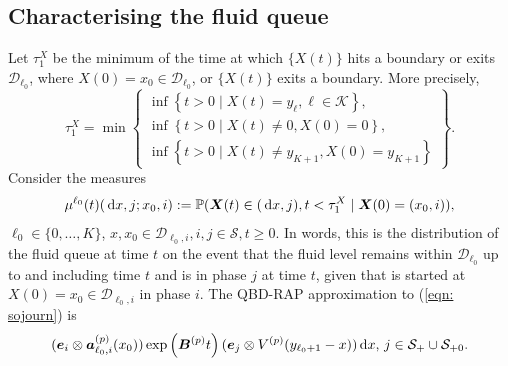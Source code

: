 \subsection{Characterising the fluid queue}
Let \(\tau_1^X\) be the minimum of the time at which \(\{X(t)\}\) hits a boundary or exits \(\mathcal D_{\ell_0}\), where \(X(0)=x_0\in\mathcal D_{\ell_0}\), or \(\{X(t)\}\) exits a boundary. More precisely, 
\[\tau_1^X = \min\left\{\begin{array}{c}\inf\left\{t>0\mid X(t)=y_{\ell}, \ell\in\mathcal K\right\}, \\ \inf\left\{t>0 \mid X(t) \neq 0, X(0)=0\right\}, \\ \inf\left\{t>0 \mid X(t) \neq y_{K+1}, X(0)=y_{K+1}\right\} \end{array} \right\}.\]
Consider the measures 
\begin{align}\label{eqn: sojourn}
	\mu^{\ell_0}(t)(\, \mathrm{d} x,j; x_0,i) := \mathbb P(\boldsymbol X(t)\in (\, \mathrm{d} x,j), t<\tau_1^X \mid \boldsymbol X(0) = (x_0, i)),
\end{align}
\(\ell_0\in\{0,\dots,K\}\), \(x,x_0 \in\mathcal D_{\ell_0,i}, i,j\in\mathcal S, t \geq 0. \)
In words, this is the distribution of the fluid queue at time \(t\) on the event that the fluid level remains within \(\mathcal D_{\ell_0}\) up to and including time \(t\) and is in phase \(j\) at time \(t\), given that is started at \(X(0)=x_0\in\mathcal D_{\ell_0,i}\) in phase \(i\). The QBD-RAP approximation to (\ref{eqn: sojourn}) is 
\begin{align}
	(\boldsymbol e_i\otimes \boldsymbol  a_{\ell_0,i}^{(p)}(x_0)) \exp\left(\boldsymbol{B}^{(p)}t\right)(\boldsymbol e_j \otimes V^{(p)}(y_{\ell_0+1}-x))\, \mathrm{d} x,\,j\in\mathcal{S}_+\cup\mathcal{S}_{+0}. \label{eqn: ldll}
\end{align}
